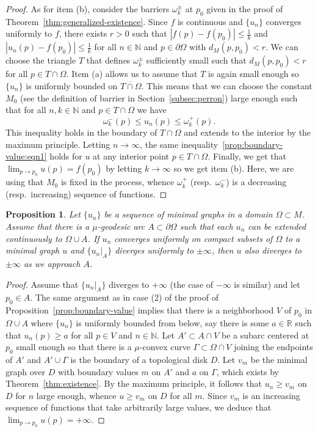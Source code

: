 \documentclass[a4paper,10pt,reqno]{amsart}
\newcommand{\N}{\mathbb{N}}
\newcommand{\R}{\mathbb{R}}
\newtheorem{proposition}[theorem]{Proposition}
\theoremstyle{definition}
\theoremstyle{remark}
\numberwithin{equation}{section}
\begin{document}
\begin{proof}
As for item (b), consider the barriers $\omega_k^{\pm}$ at $p_0$ given in the proof of Theorem~\ref{thm:generalized-existence}. Since $f$ is continuous and $\{u_n\}$ converges uniformly to $f$, there exists $r>0$ such that $|f(p)-f(p_0)|\leq\frac{1}{k}$ and $|u_n(p)-f(p_0)|\leq\frac{1}{k}$ for all $n\in\N$ and $p\in\partial\Omega$ with $d_M(p,p_0)<r$. We can choose the triangle $T$ that defines $\omega_k^{\pm}$ sufficiently small such that $d_M(p,p_0)<r$ for all $p\in T\cap\Omega$. Item (a) allows us to assume that $T$ is again small enough so $\{u_n\}$ is uniformly bounded on $\overline{T\cap\Omega}$. This means that we can choose the constant $M_0$ (see the definition of barrier in Section~\ref{subsec:perron}) large enough such that for all $n,k\in\N$ and $p\in T\cap\Omega$ we have
\begin{equation}\label{prop:boundary-value:eqn1}
\omega_k^-(p)\leq u_n(p)\leq\omega_k^+(p).
\end{equation}
This inequality holds in the boundary of $T\cap\Omega$ and extends to the interior by the maximum principle. Letting $n\to\infty$, the same inequality~\eqref{prop:boundary-value:eqn1} holds for $u$ at any interior point $p\in T\cap\Omega$. Finally, we get that $\lim_{p\to p_0}u(p)=f(p_0)$ by letting $k\to\infty$ so we get item (b). Here, we are using that $M_0$ is fixed in the process, whence $\omega_k^+$ (resp.\ $\omega_k^-$) is a decreasing (resp.\ increasing) sequence of functions.
\end{proof}

\begin{proposition}\label{prop:boundary-infinity}
Let $\{u_n\}$ be a sequence of minimal graphs in a domain $\Omega\subset M$. Assume that there is a $\mu$-geodesic arc $A\subset\partial\Omega$ such that each $u_n$ can be extended continuously to $\Omega\cup A$. If $u_n$ converges uniformly on compact subsets of $\Omega$ to a minimal graph $u$ and $\{u_n|_A\}$ diverges uniformly to $\pm\infty$, then $u$ also diverges to $\pm\infty$ as we approach $A$.
\end{proposition}

\begin{proof}
Assume that $\{u_n|_A\}$ diverges to $+\infty$ (the case of $-\infty$ is similar) and let $p_0\in A$. The same argument as in case (2) of the proof of Proposition~\ref{prop:boundary-value} implies that there is a neighborhood $V$ of $p_0$ in $\Omega\cup A$ where $\{u_n\}$ is uniformly bounded from below, say there is some $a\in\R$ such that $u_n(p)\geq a$ for all $p\in V$ and $n\in\N$. Let $A'\subset A\cap V$ be a subarc centered at $p_0$ small enough so that there is a $\mu$-convex curve $\Gamma\subset\Omega\cap V$ joining the endpoints of $A'$ and $A'\cup\Gamma$ is the boundary of a topological disk $D$. Let $v_m$ be the minimal graph over $D$ with boundary values $m$ on $A'$ and $a$ on $\Gamma$, which exists by Theorem~\ref{thm:existence}. By the maximum principle, it follows that $u_n\geq v_m$ on $D$ for $n$ large enough, whence $u\geq v_m$ on $D$ for all $m$. Since $v_m$ is an increasing sequence of functions that take arbitrarily large values, we deduce that $\lim_{p\to p_0}u(p)=+\infty$.
\end{proof}
	
\end{document}
